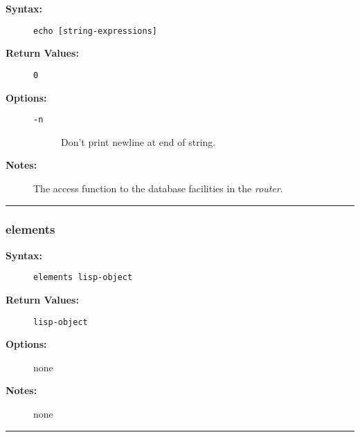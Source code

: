 \begin{description}
\item[{\bf Syntax:}] \mbox{}

{\tt echo [string-expressions]}

\item[{\bf Return Values:}] \mbox{}

\begin{description}
\item[{\tt 0}] \mbox{}

        

\end{description}


\item[{\bf Options:}] \mbox{}

\begin{description}
\item[{\tt -n}] \mbox{}

Don't print newline at end of string.

\end{description}


\item[{\bf Notes:}] \mbox{}

The access function to the database facilities in the 
{\em router}.

\end{description}


\hrule
\subsubsection{elements}

\begin{description}
\item[{\bf Syntax:}] \mbox{}

{\tt elements lisp-object}

\item[{\bf Return Values:}] \mbox{}

{\tt lisp-object}

\item[{\bf Options:}] \mbox{}

none  

\item[{\bf Notes:}] \mbox{}

none

\end{description}


\hrule
